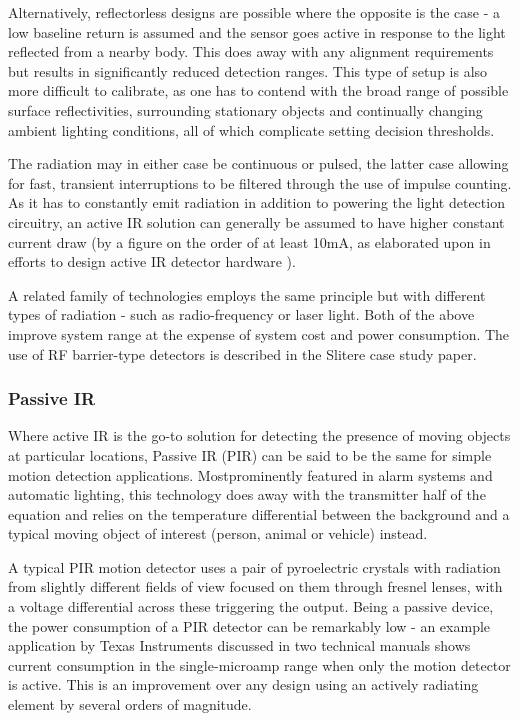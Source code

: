 \documentclass[10pt,nocopyrightspace]{ewsn-proc}
\begin{document}
Alternatively, reflectorless designs are possible where the opposite is the case - a low baseline return is assumed and the sensor goes active in response to the light reflected from a nearby body. This does away with any alignment requirements but results in significantly reduced detection ranges. This type of setup is also more difficult to calibrate, as one has to contend with the broad range of possible surface reflectivities, surrounding stationary objects and continually changing ambient lighting conditions, all of which complicate setting decision thresholds.

The radiation may in either case be continuous or pulsed, the latter case allowing for fast, transient interruptions to be filtered through the use of impulse counting. As it has to constantly emit radiation in addition to powering the light detection circuitry, an active IR solution can generally be assumed to have higher constant current draw (by a figure on the order of at least 10mA, as elaborated upon in efforts to design active IR detector hardware \cite{ActiveIR}).


A related family of technologies employs the same principle but with different types of radiation - such as radio-frequency or laser light. Both of the above improve system range at the expense of system cost and power consumption. The use of RF barrier-type detectors is described in the Slitere case study paper\cite{Slitere}.

\subsubsection{Passive IR}
Where active IR is the go-to solution for detecting the presence of moving objects at particular locations, Passive IR (PIR) can be said to be the same for simple motion detection applications. Mostprominently featured in alarm systems and automatic lighting, this technology does away with the transmitter half of the equation and relies on the temperature differential between the background and a typical moving object of interest (person, animal or vehicle) instead.

A typical PIR motion detector uses a pair of pyroelectric crystals with radiation from slightly different fields of view focused on them through fresnel lenses, with a voltage differential across these triggering the output. Being a passive device, the power consumption of a PIR detector can be remarkably low - an example application by Texas Instruments discussed in two technical manuals\cite{TI:PIR}\cite{TI:APP} shows current consumption in the single-microamp range when only the motion detector is active. This is an improvement over any design using an actively radiating element by several orders of magnitude.
\end{document}
